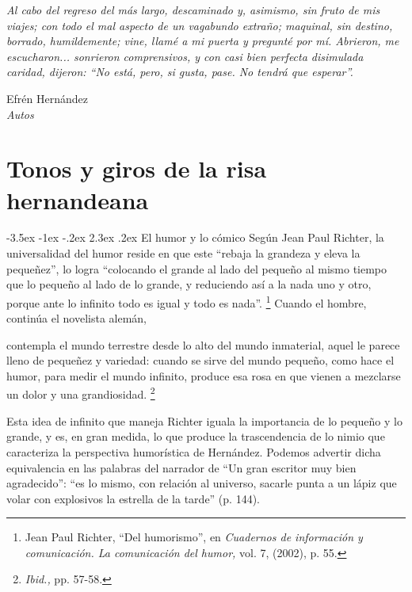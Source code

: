 \documentclass[14pt,twoside,final]{extbook} %
\makeatletter
\let\oldfootnote\footnote
\renewcommand\footnote[1]{%
\oldfootnote{\hspace{1mm}#1}}
\renewcommand\section{\@startsection {section}{1}{\z@}%
                                     {-3.5ex \@plus -1ex \@minus -.2ex}%
                                     {2.3ex \@plus .2ex}%
                                     {\normalfont\large\bfseries\sc}}
\makeatother
\begin{document}
\begin{flushright}
\begin{minipage}{7.5cm} %
\emph{Al cabo del regreso del más largo, descaminado y, asimismo, sin fruto de mis viajes; con todo el mal aspecto de un vagabundo extraño; maquinal, sin destino, borrado, humildemente; vine, llamé a mi puerta y pregunté por mí. Abrieron, me escucharon... sonrieron comprensivos, y con casi bien perfecta disimulada caridad, dijeron: ``No está, pero, si gusta, pase. No tendrá que esperar''.}
\begin{flushright}
Efrén Hernández \\ \emph{Autos}
\end{flushright}
\end{minipage}
\end{flushright}
\chapter[\textsc{Tonos y giros de la risa hernandeana}]{Tonos y giros de la risa hernandeana}\label{ch:tonos-y-giros-de-la-risa-hernandeana}
\BgThispage
\thispagestyle{empty}
\pagestyle{fancy}
\fancyhf{} %
\fancyhead[RO,LE]{\thepage}
\renewcommand{\headrulewidth}{0pt}
\section{El humor y lo cómico}\label{sec:el-humor-y-lo-comico}
Según Jean Paul Richter, la universalidad del humor reside en que este ``rebaja la grandeza y eleva la pequeñez'', lo logra ``colocando el grande al lado del pequeño al mismo tiempo que lo pequeño al lado de lo grande, y reduciendo así a la nada uno y otro, porque ante lo infinito todo es igual y todo es nada''.\footnote{Jean Paul Richter, ``Del humorismo'', en \emph{Cuadernos de información y comunicación. La comunicación del humor,} vol. 7, (2002), p. 55.} Cuando el hombre, continúa el novelista alemán,
\begin{quoting}
contempla el mundo terrestre desde lo alto del mundo inmaterial, aquel le parece lleno de pequeñez y variedad: cuando se sirve del mundo pequeño, como hace el humor, para medir el mundo infinito, produce esa rosa en que vienen a mezclarse un dolor y una grandiosidad.\footnote{\emph{Ibid.,} pp. 57-58.}
\end{quoting}
Esta idea de infinito que maneja Richter iguala la importancia de lo pequeño y lo grande, y es, en gran medida, lo que produce la trascendencia de lo nimio que caracteriza la perspectiva humorística de Hernández. Podemos advertir dicha equivalencia en las palabras del narrador de ``Un gran escritor muy bien agradecido'': ``es lo mismo, con relación al universo, sacarle punta a un lápiz que volar con explosivos la estrella de la tarde'' (p. 144).
\end{document}
